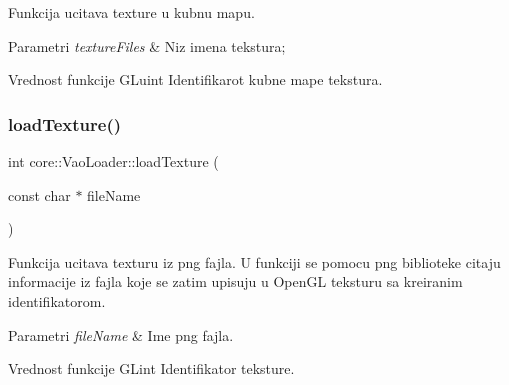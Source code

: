 Funkcija ucitava texture u kubnu mapu. 


\begin{DoxyParams}{Parametri}
{\em texture\+Files} & Niz imena tekstura; \\
\hline
\end{DoxyParams}
\begin{DoxyReturn}{Vrednost funkcije}
G\+Luint Identifikarot kubne mape tekstura. 
\end{DoxyReturn}
\mbox{\label{classcore_1_1VaoLoader_aeefd4de3346c1036d8d7249694fd404d}} 
\subsubsection{\texorpdfstring{load\+Texture()}{loadTexture()}}
{\footnotesize\ttfamily int core\+::\+Vao\+Loader\+::load\+Texture (\begin{DoxyParamCaption}\item[{const char $\ast$}]{file\+Name }\end{DoxyParamCaption})}



Funkcija ucitava texturu iz png fajla. U funkciji se pomocu png biblioteke citaju informacije iz fajla koje se zatim upisuju u Open\+GL teksturu sa kreiranim identifikatorom. 


\begin{DoxyParams}{Parametri}
{\em file\+Name} & Ime png fajla. \\
\hline
\end{DoxyParams}
\begin{DoxyReturn}{Vrednost funkcije}
G\+Lint Identifikator teksture. 
\end{DoxyReturn}
\mbox{\label{classcore_1_1VaoLoader_a61e0aea1c2f59726a2ea8ba323d32b67}} 

